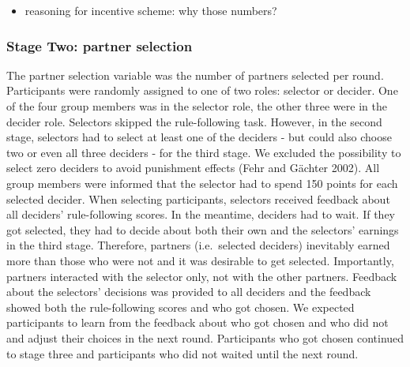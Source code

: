 \documentclass[man]{apa6}
\providecommand{\tightlist}{%
  \setlength{\itemsep}{0pt}\setlength{\parskip}{0pt}}
\begin{document}
\begin{itemize}
\tightlist
\item
  reasoning for incentive scheme: why those numbers?
\end{itemize}

\hypertarget{stage-two-partner-selection}{%
\subsubsection{Stage Two: partner
selection}\label{stage-two-partner-selection}}

The partner selection variable was the number of partners selected per
round. Participants were randomly assigned to one of two roles: selector
or decider. One of the four group members was in the selector role, the
other three were in the decider role. Selectors skipped the
rule-following task. However, in the second stage, selectors had to
select at least one of the deciders - but could also choose two or even
all three deciders - for the third stage. We excluded the possibility to
select zero deciders to avoid punishment effects (Fehr and Gächter
2002). All group members were informed that the selector had to spend
150 points for each selected decider. When selecting participants,
selectors received feedback about all deciders' rule-following scores.
In the meantime, deciders had to wait. If they got selected, they had to
decide about both their own and the selectors' earnings in the third
stage. Therefore, partners (i.e.~selected deciders) inevitably earned
more than those who were not and it was desirable to get selected.
Importantly, partners interacted with the selector only, not with the
other partners. Feedback about the selectors' decisions was provided to
all deciders and the feedback showed both the rule-following scores and
who got chosen. We expected participants to learn from the feedback
about who got chosen and who did not and adjust their choices in the
next round. Participants who got chosen continued to stage three and
participants who did not waited until the next round.
\end{document}
